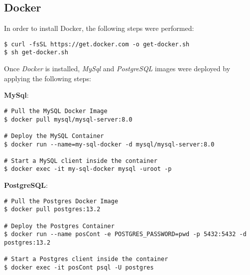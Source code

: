 \subsection{\label{sec:despliegue-docker}Docker}

In order to install Docker, the following steps were performed:

\begin{verbatim}
$ curl -fsSL https://get.docker.com -o get-docker.sh
$ sh get-docker.sh
\end{verbatim}

Once \emph{Docker} is installed, \emph{MySql} and \emph{PostgreSQL} images were deployed by applying the following steps:

\textbf{MySql}:

\begin{verbatim}
# Pull the MySQL Docker Image
$ docker pull mysql/mysql-server:8.0

# Deploy the MySQL Container
$ docker run --name=my-sql-docker -d mysql/mysql-server:8.0

# Start a MySQL client inside the container
$ docker exec -it my-sql-docker mysql -uroot -p
\end{verbatim}

\textbf{PostgreSQL}:

\begin{verbatim}
# Pull the Postgres Docker Image
$ docker pull postgres:13.2

# Deploy the Postgres Container
$ docker run --name posCont -e POSTGRES_PASSWORD=pwd -p 5432:5432 -d postgres:13.2

# Start a Postgres client inside the container
$ docker exec -it posCont psql -U postgres
\end{verbatim}
